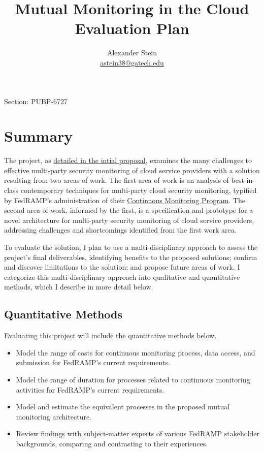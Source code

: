 \documentclass{jdf}
\begin{document}
Section: PUBP-6727
\title{Mutual Monitoring in the Cloud \\ Evaluation Plan}
\author{Alexander Stein \\ \hyperlink{mailto:astein38@gatech.edu}{astein38@gatech.edu}}

\maketitle
\thispagestyle{fancy}

\section*{Summary}

The project, as \hyperlink{https://github.com/aj-stein/practicum_proposal/blob/5238ba70dd8736320400ee6907b3fcfdd8ae672b/paper.pdf}{detailed in the intial proposal}, examines the many challenges to effective multi-party security monitoring of cloud service providers with a solution resulting from two areas of work. The first area of work is an analysis of best-in-class contemporary techniques for multi-party cloud security monitoring, typified by FedRAMP's administration of their \hyperlink{https://web.archive.org/web/20250616221039/https://www.fedramp.gov/assets/resources/documents/CSP_Continuous_Monitoring_Performance_Management_Guide.pdf}{Continuous Monitoring Program}. The second area of work, informed by the first, is a specification and prototype for a novel architecture for multi-party security monitoring of cloud service providers, addressing challenges and shortcomings identified from the first work area.

To evaluate the solution, I plan to use a multi-disciplinary approach to assess the project's final deliverables, identifying benefits to the proposed solutions; confirm and discover limitations to the solution; and propose future areas of work. I categorize this multi-disciplinary approach into qualitative and quantitative methods, which I describe in more detail below.

\subsection*{Quantitative Methods}

Evaluating this project will include the quantitative methods below.

\begin{itemize}
  \item Model the range of costs for continuous monitoring process, data access, and submission for FedRAMP's current requirements.
  \item Model the range of duration for processes related to continuous monitoring activities for FedRAMP's current requirements.
  \item Model and estimate the equivalent processes in the proposed mutual monitoring architecture.
  \item Review findings with subject-matter experts of various FedRAMP stakeholder backgrounds, comparing and contrasting to their experiences.
\end{itemize}
\end{document}
